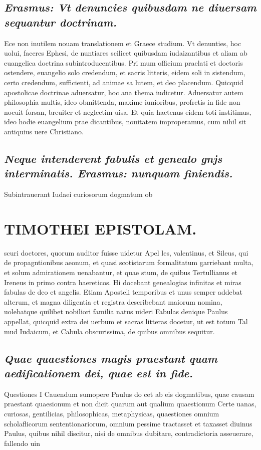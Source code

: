 \documentclass{article}
\begin{document}
\begin{pages}
\subsection*{\textit{Erasmus: Vt denuncies quibusdam ne diuersam sequantur doctrinam. }}\pstart Ece non inutilem nouam translationem et Graece studium. Vt denunties, hoc uolui, faceres Ephesi, de nuntiares scilicet quibusdam iudaizantibus et aliam ab euangelica doctrina subintroducentibus. Pri mum officium praelati et doctoris ostendere, euangelio solo credendum, et sacris litteris, eidem soli in sistendum, certo credendum, sufficienti, ad animae sa lutem, et deo placendum.  \pend\pstart Quicquid apostolicae doctrinae aduersatur, hoc ana thema iudicetur. Aduersatur autem philosophia multis, ideo obmittenda, maxime iunioribus, profrctis in fide non nocuit forsan, breuiter et neglectim uisa. Et quia hactenus eidem toti institimus, ideo hodie euangelium prae dicantibus, nouitatem improperamus, cum nihil sit antiquius uere Christiano.  \pend
{}
{}
\subsection*{\textit{Neque intenderent fabulis et genealo gnjs interminatis. Erasmus: nunquam finiendis. }}\pstart Subintrauerant Iudaei curiosorum dogmatum ob  \pend
\section*{TIMOTHEI EPISTOLAM. }
\marginpar{[ p.13 ]}\pstart scuri doctores, quorum auditor fuisse uidetur Apel les, valentinus, et Sileus, qui de propagntionibus aeonum, et quasi scotistarum formalitatum garriebant multa, et solum admirationem uenabantur, et quae stum, de quibus Tertullianus et Ireneus in primo contra haereticos. Hi docebant genealogias infinitas et miras fabulas de deo et angelis. Etiam Aposteli temporibus et unus semper addebat alterum, et magna diligentia et registra describebant maiorum nomina, uolebatque quilibet nobiliori familia natus uideri  \pend\pstart Fabulas denique Paulus appellat, quicquid extra dei uerbum et sacras litteras docetur, ut est totum Tal mud Iudaicum, et Cabula obscurissima, de quibus omnibus sequitur.  \pend
{}
{}
\subsection*{\textit{Quae quaestiones magis praestant quam aedificationem dei, quae est in fide. }}\pstart Questiones I Cauendum sumopere Paulus do cet ab eis dogmatibus, quae causam praestant quaesionum et non dicit quarum aut qualium quaestionum Certe uanas, curiosas, gentilicias, philosophicas, metaphysicas, quaestiones omnium scholaflicorum sententionariorum, omnium pessime tractasset et taxasset diuinus Paulus, quibus nihil discitur, nisi de omnibus dubitare, contradictoria asseuerare, fallendo uin  \pend

\end{pages}
\end{document}
